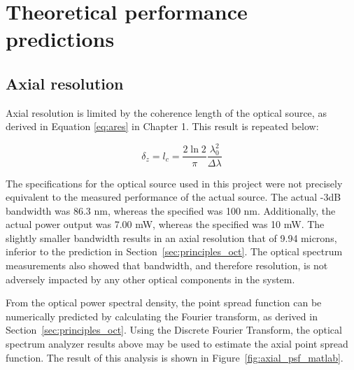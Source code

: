 \section{Theoretical performance predictions}
\label{sec:theory_res}

\subsection{Axial resolution}
\label{sec:axial_res}

Axial resolution is limited by the coherence length of the optical source, as derived in Equation \ref{eq:ares} in Chapter 1. This result is repeated below:

\begin{equation} \label{eq:ares2}
\delta_z = l_c = \frac{2 \ln{2}}{\pi} \frac{\lambda_0^2}{\Delta \lambda}
\end{equation}

The specifications for the optical source used in this project were not precisely equivalent to the measured performance of the actual source. The actual -3dB bandwidth was 86.3 nm, whereas the specified was 100 nm. Additionally, the actual power output was 7.00 mW, whereas the specified was 10 mW. The slightly smaller bandwidth results in an axial resolution that of 9.94 microns, inferior to the prediction in Section~\ref{sec:principles_oct}. The optical spectrum measurements also showed that bandwidth, and therefore resolution, is not adversely impacted by any other optical components in the system. %


From the optical power spectral density, the point spread function can be numerically predicted by calculating the Fourier transform, as derived in Section~\ref{sec:principles_oct}. Using the Discrete Fourier Transform, the optical spectrum analyzer results above may be used to estimate the axial point spread function. The result of this analysis is shown in Figure~\ref{fig:axial_psf_matlab}.

